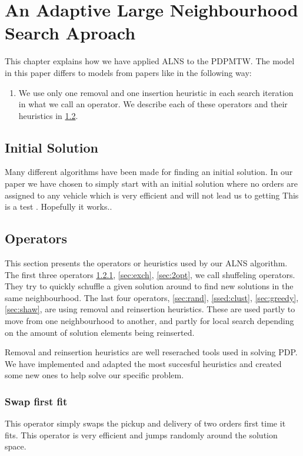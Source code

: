 \documentclass[../main.tex]{subfiles}
\begin{document}
                                                
\chapter{An Adaptive Large Neighbourhood Search Aproach}
\label{ch:appr}
This chapter explains how we have applied ALNS to the PDPMTW. The model in this paper differs to models from papers like \cite{ropke06} in the following way:
\begin{enumerate}
    \item We use only one removal and one insertion heuristic in each search iteration in what we call an operator. We describe each of these operators and their heuristics in \ref{sec:oper}.
\end{enumerate}
\section{Initial Solution}
\label{sec:init}
Many different algorithms have been made for finding an initial solution. In our paper we have chosen to simply start with an initial solution where no orders are assigned to any vehicle which is very efficient and will not lead us to getting 
This is a test \cite{shaw97}. Hopefully it works..              

\section{Operators}
\label{sec:oper}
This section presents the operators or heuristics used by our ALNS algorithm.
The first three operators \ref{sec:swap}, \ref{sec:exch}, \ref{sec:2opt}, we call shuffeling operators. They try to quickly schuffle a given solution around to find new solutions in the same neighbourhood.
The last four operators, \ref{sec:rand}, \ref{ssed:clust}, \ref{sec:greedy}, \ref{sec:shaw}, are using removal and reinsertion heuristics. These are used partly to move from one neighbourhood to another, and partly for local search depending on the  amount of solution elements being reinserted.  

Removal and reinsertion heuristics are well reserached tools used in solving PDP. 
We have implemented and adapted the most succesful heuristics and created some new ones to help solve our specific problem. 

\subsection{Swap first fit}
\label{sec:swap}
This operator simply swaps the pickup and delivery of two orders first time it fits. 
This operator is very efficient and jumps randomly around the solution space.
\end{document}
